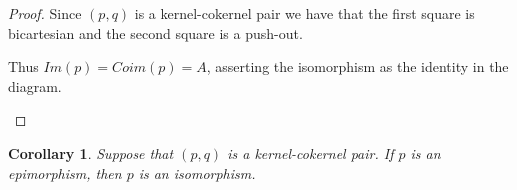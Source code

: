 \documentclass[12pt]{article}
\newtheorem{corollary}{Corollary}[theorem]
\theoremstyle{definition}
\theoremstyle{remark}
\begin{document}
            \begin{proof}
                Since $(p,q)$ is a kernel-cokernel pair we have that the first square is bicartesian and the second square is a push-out.
                \begin{center}
                \end{center}
                Thus $Im(p)=Coim(p)=A$, asserting the isomorphism as the identity in the diagram.
                \begin{center}
                \end{center}
            \end{proof}

            \begin{corollary}
                Suppose that $(p,q)$ is a kernel-cokernel pair. If $p$ is an epimorphism, then $p$ is an isomorphism.
            \end{corollary}
\end{document}
